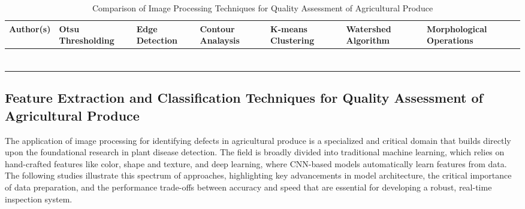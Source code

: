 {\newpage

\begin{table}
	\centering
	\caption{Comparison of Image Processing Techniques for Quality Assessment of Agricultural Produce}
	\label{tab:relatedstudies_two}
	\begin{tabular}{
			>{\centering\arraybackslash}m{3cm} 
			>{\centering\arraybackslash}m{2.5cm}   
			>{\centering\arraybackslash}m{2cm} 
			>{\centering\arraybackslash}m{2cm}    
			>{\centering\arraybackslash}m{2cm}  
			>{\centering\arraybackslash}m{2cm}  
			>{\centering\arraybackslash}m{2.5cm}
		}
		\toprule
		\textbf{Author(s)} & \textbf{Otsu Thresholding} & \textbf{Edge Detection} & \textbf{Contour Analaysis} & \textbf{K-means Clustering} & \textbf{Watershed Algorithm} & \textbf{Morphological Operations} \\
		\midrule
		
		\citet{amna2023machine} &
		&
		&
		\checkmark	&
		&
		&
		\checkmark \\
		
		\citet{Doan2023} &
		\checkmark &
		\checkmark &
		\checkmark &
		&
		&
		\\
		
		\citet{Narendra2021} &
		&
		&
		&
		\checkmark &
		\checkmark &
		\\
		
		\citet{Kazi2023} &
		&
		&
		&
		\checkmark &
		&
		\\
		
		\citet{Luo2024} &
		\checkmark &
		\checkmark &
		&
		&
		&
		\checkmark \\
		
		\citet{Alqethami2022} &
		&
		&
		&
		\checkmark &
		&
		\\
		
		\citet{Javidan2023} &
		&
		\checkmark &
		&
		\checkmark &
		&
		\\
		
		\bottomrule
	\end{tabular}
\end{table}

\newpage

\subsection{Feature Extraction and Classification  Techniques for Quality Assessment of Agricultural Produce}
The application of image processing for identifying defects in agricultural produce is a specialized and critical domain that builds directly upon the foundational research in plant disease detection. The field is broadly divided into traditional machine learning, which relies on hand-crafted features like color, shape and texture, and deep learning, where CNN-based models automatically learn features from data. The following studies illustrate this spectrum of approaches, highlighting key advancements in model architecture, the critical importance of data preparation, and the performance trade-offs between accuracy and speed that are essential for developing a robust, real-time inspection system.

}
